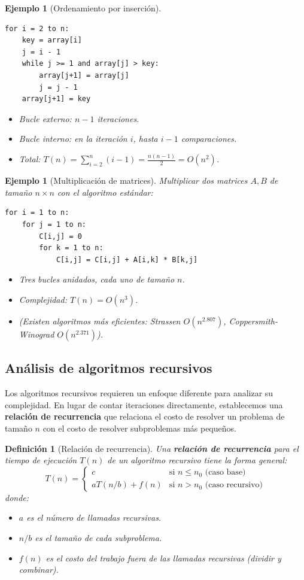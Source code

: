 \documentclass[a4paper,11pt]{report}
\newtheorem{definition}[theorem]{Definición}
\newtheorem{example}[theorem]{Ejemplo}
\begin{document}
\begin{example}[Ordenamiento por inserción]
\begin{verbatim}
for i = 2 to n:
    key = array[i]
    j = i - 1
    while j >= 1 and array[j] > key:
        array[j+1] = array[j]
        j = j - 1
    array[j+1] = key
\end{verbatim}
\begin{itemize}
\item Bucle externo: $n-1$ iteraciones.
\item Bucle interno: en la iteración $i$, hasta $i-1$ comparaciones.
\item Total: $T(n) = \sum_{i=2}^n (i-1) = \frac{n(n-1)}{2} = O(n^2)$.
\end{itemize}
\end{example}

\begin{example}[Multiplicación de matrices]
Multiplicar dos matrices $A, B$ de tamaño $n \times n$ con el algoritmo estándar:
\begin{verbatim}
for i = 1 to n:
    for j = 1 to n:
        C[i,j] = 0
        for k = 1 to n:
            C[i,j] = C[i,j] + A[i,k] * B[k,j]
\end{verbatim}
\begin{itemize}
\item Tres bucles anidados, cada uno de tamaño $n$.
\item Complejidad: $T(n) = O(n^3)$.
\item (Existen algoritmos más eficientes: Strassen $O(n^{2.807})$, Coppersmith-Winograd $O(n^{2.371})$).
\end{itemize}
\end{example}

\subsection{Análisis de algoritmos recursivos}

Los algoritmos recursivos requieren un enfoque diferente para analizar su complejidad. En lugar de contar iteraciones directamente, establecemos una \textbf{relación de recurrencia} que relaciona el costo de resolver un problema de tamaño $n$ con el costo de resolver subproblemas más pequeños.

\begin{definition}[Relación de recurrencia]
Una \textbf{relación de recurrencia} para el tiempo de ejecución $T(n)$ de un algoritmo recursivo tiene la forma general:
\[
T(n) = \begin{cases}
c & \text{si } n \leq n_0 \text{ (caso base)} \\
aT(n/b) + f(n) & \text{si } n > n_0 \text{ (caso recursivo)}
\end{cases}
\]
donde:
\begin{itemize}
\item $a$ es el número de llamadas recursivas.
\item $n/b$ es el tamaño de cada subproblema.
\item $f(n)$ es el costo del trabajo fuera de las llamadas recursivas (dividir y combinar).
\end{itemize}
\end{definition}
\end{document}
